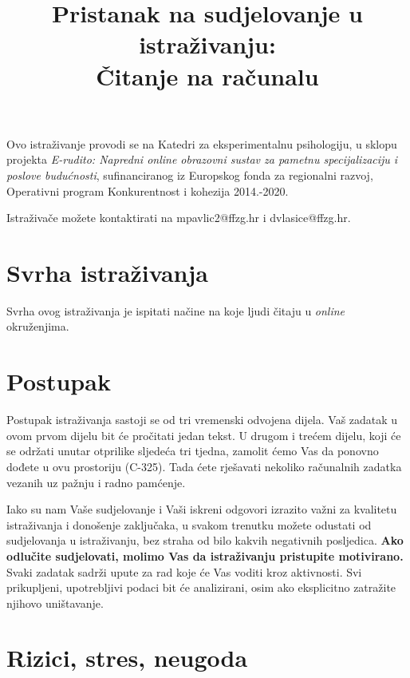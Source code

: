 \documentclass[11pt]{article}
\title{\bfseries \large Pristanak na sudjelovanje u istraživanju:\\
        \Large Čitanje na računalu}
\date{}
\author{}
\begin{document}
\vspace{-4em}

\maketitle

\vspace*{-4em}

\noindent Ovo istraživanje provodi se na Katedri za eksperimentalnu psihologiju, u sklopu
projekta \textit{E-rudito: Napredni online obrazovni sustav za pametnu
    specijalizaciju i poslove budućnosti}, sufinanciranog iz Europskog fonda za
regionalni razvoj, Operativni program Konkurentnost i kohezija 2014.-2020.

\vspace{6pt}

\noindent Istraživače možete kontaktirati na mpavlic2@ffzg.hr i dvlasice@ffzg.hr.

\section{Svrha istraživanja}

Svrha ovog istraživanja je ispitati načine na koje ljudi čitaju u \textit{online}
okruženjima.

\section{Postupak}

Postupak istraživanja sastoji se od tri vremenski odvojena dijela.
Vaš zadatak u ovom prvom dijelu bit će pročitati jedan tekst.
U drugom i trećem dijelu, koji će se održati unutar otprilike sljedeća tri tjedna, zamolit ćemo  Vas da ponovno dođete u ovu prostoriju (C-325). Tada ćete rješavati nekoliko računalnih zadatka vezanih uz pažnju i radno pamćenje.


Iako su nam Vaše sudjelovanje i Vaši iskreni odgovori izrazito važni za
kvalitetu istraživanja i donošenje zaključaka, u svakom trenutku možete odustati
od sudjelovanja u istraživanju, bez straha od bilo kakvih negativnih posljedica. 
\textbf{Ako odlučite sudjelovati, molimo Vas da istraživanju pristupite motivirano.}
Svaki zadatak sadrži upute za rad koje će Vas voditi kroz aktivnosti.
Svi prikupljeni, upotrebljivi podaci bit će analizirani, osim ako eksplicitno
zatražite njihovo uništavanje.

\section{Rizici, stres, neugoda}
\end{document}
